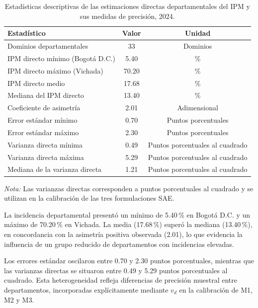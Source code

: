 \begin{table}[!htbp]
\centering
\footnotesize
\caption{Estadísticas descriptivas de las estimaciones directas departamentales del IPM y sus medidas de precisión, 2024.}
\label{tab:resumen_variable_respuesta}
\renewcommand{\arraystretch}{1.2}
\setlength{\tabcolsep}{7pt}
\begin{tabular}{p{5.2cm} c c}
\hline
Estadístico & Valor & Unidad \\
\hline
Dominios departamentales & 33 & Dominios \\
IPM directo mínimo (Bogotá D.C.) & 5.40 & \% \\
IPM directo máximo (Vichada) & 70.20 & \% \\
IPM directo medio & 17.68 & \% \\
Mediana del IPM directo & 13.40 & \% \\
Coeficiente de asimetría & 2.01 & Adimensional \\
Error estándar mínimo & 0.70 & Puntos porcentuales \\
Error estándar máximo & 2.30 & Puntos porcentuales \\
Varianza directa mínima & 0.49 & Puntos porcentuales al cuadrado \\
Varianza directa máxima & 5.29 & Puntos porcentuales al cuadrado \\
Mediana de la varianza directa & 1.21 & Puntos porcentuales al cuadrado \\
\hline
\end{tabular}

\vspace{2mm}
\begin{minipage}{0.92\textwidth}
\footnotesize
\textit{Nota:} Las varianzas directas corresponden a puntos porcentuales al cuadrado y se utilizan en la calibración de las tres formulaciones SAE.
\end{minipage}
\end{table}

La incidencia departamental presentó un mínimo de 5.40\,\% en Bogotá D.C. y un máximo de 70.20\,\% en Vichada. La media (17.68\,\%) superó la mediana (13.40\,\%), en concordancia con la asimetría positiva observada (2.01), lo que evidencia la influencia de un grupo reducido de departamentos con incidencias elevadas.

Los errores estándar oscilaron entre 0.70 y 2.30 puntos porcentuales, mientras que las varianzas directas se situaron entre 0.49 y 5.29 puntos porcentuales al cuadrado. Esta heterogeneidad refleja diferencias de precisión muestral entre departamentos, incorporadas explícitamente mediante $v_d$ en la calibración de M1, M2 y M3.

